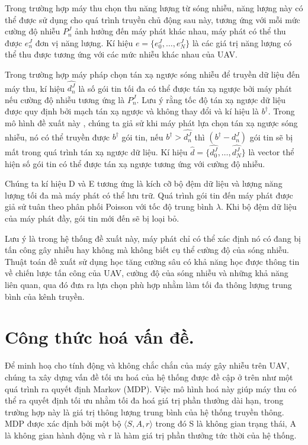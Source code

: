\documentclass{uetgraduation}
\begin{document}
Trong trường hợp máy thu chọn thu năng lượng từ sóng nhiễu, năng lượng này có thể được sử dụng cho quá trình truyền chủ động sau này, tương ứng với mỗi mức cường độ nhiễu $P_n^J$
ảnh hưởng đến máy phát khác nhau, máy phát có thể thu được $e_n^J$ đơn vị năng lượng. Kí hiệu $e = \{e_0^J, \dots, e_N^J\}$ là các giá trị năng lượng có thể thu được tương ứng
với các mức nhiễu khác nhau của UAV.

Trong trường hợp máy pháp chọn tán xạ ngược sóng nhiễu để truyền dữ liệu đến máy thu, kí hiệu $\hat{d_n^J}$ là số gói tin tối đa có thể được tán xạ ngược bởi máy phát nếu
cường độ nhiễu tương ứng là $P_n^J$. Lưu ý rằng tốc độ tán xạ ngược dữ liệu được quy định bởi mạch tán xạ ngược và không thay đổi và kí hiệu là $b^{\dagger}$. Trong mô hình đề xuất này
, chúng ta giả sử khi máy phát lựa chọn tán xạ ngược sóng nhiễu, nó có thể truyền được $b^{\dagger}$ gói tin, nếu $b^{\dagger} > \hat{d_n^J}$ thì $(b^{\dagger} - d_n^J)$ gói tin sẽ bị mất trong
quá trình tán xạ ngược dữ liệu. Kí hiệu $\hat{d} = \{\hat{d_0^J}, \dots, \hat{d_N^J}\}$ là vector thể hiện số gói tin có thể được tán xạ ngược tương ứng với cường độ nhiễu.

Chúng ta kí hiệu D và E tương ứng là kích cỡ bộ đệm dữ liệu và lượng năng lượng tối đa mà máy phát có thể lưu trữ. Quá trình gói tin đến máy phát được giả sử tuân theo phân
phối Poisson với tốc độ trung bình $\lambda$. Khi bộ đệm dữ liệu của máy phát đầy, gói tin mới đến sẽ bị loại bỏ.

Lưu ý là trong hệ thống đề xuất này, máy phát chỉ có thể xác định nó có đang bị tấn công gây nhiễu hay không mà không biết cụ thể cường độ của sóng nhiễu. Thuật toán đề xuất sử dụng học tăng 
cường sâu có khả năng học được thông tin về chiến lược tấn công của UAV, cường độ của sóng nhiễu và những khả năng liên quan, qua đó đưa ra lựa chọn
phù hợp nhằm làm tối đa thông lượng trung bình của kênh truyền.


\section{Công thức hoá vấn đề.}
Để minh hoạ cho tính động và không chắc chắn của máy gây nhiễu trên UAV, chúng ta xây dựng vấn đề tối ưu hoá của hệ thống được đề cập ở trên như một quá trình ra quyết định
Markov (MDP). Việc mô hình hoá này giúp máy thu có thể ra quyết định tối ưu nhằm tối đa hoá giá trị phần thưởng dài hạn, trong trường hợp này là giá trị thông lượng trung bình
của hệ thống truyền thông. MDP được xác định bởi một bộ $\langle S, A, r \rangle$ trong đó S là không gian trạng thái, A là không gian hành động và r là hàm giá trị phần thưởng
tức thời của hệ thống.
\end{document}
